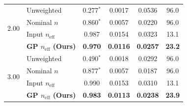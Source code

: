 \begin{table}[!htbp]
{\begin{tabular}{@{}llcccc@{}}
\midrule
\multirow{4}{*}{2.00} 
& Unweighted         & 0.277$^*$ & 0.0017 & 0.0536 & 96.0 \\
& Nominal $n$        & 0.860$^*$ & 0.0057 & 0.0220 & 96.0 \\
& Input $n_{\mathrm{eff}}$ & 0.987     & 0.0154 & 0.0323 & 13.1 \\
& \textbf{GP $n_{\mathrm{eff}}$ (Ours)} & \textbf{0.970} & \textbf{0.0116} & \textbf{0.0257} & \textbf{23.2} \\
\midrule
\multirow{4}{*}{3.00} 
& Unweighted         & 0.490$^*$ & 0.0018 & 0.0292 & 96.0 \\
& Nominal $n$        & 0.877$^*$ & 0.0057 & 0.0187 & 96.0 \\
& Input $n_{\mathrm{eff}}$ & 0.990     & 0.0153 & 0.0310 & 13.1 \\
& \textbf{GP $n_{\mathrm{eff}}$ (Ours)} & \textbf{0.983} & \textbf{0.0113} & \textbf{0.0238} & \textbf{23.9} \\
\bottomrule
\end{tabular}}
\end{table}